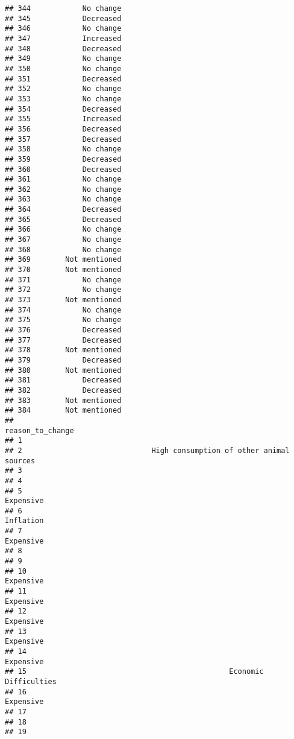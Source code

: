 \documentclass[
]{article}
\begin{document}
\begin{verbatim}
## 344            No change
## 345            Decreased
## 346            No change
## 347            Increased
## 348            Decreased
## 349            No change
## 350            No change
## 351            Decreased
## 352            No change
## 353            No change
## 354            Decreased
## 355            Increased
## 356            Decreased
## 357            Decreased
## 358            No change
## 359            Decreased
## 360            Decreased
## 361            No change
## 362            No change
## 363            No change
## 364            Decreased
## 365            Decreased
## 366            No change
## 367            No change
## 368            No change
## 369        Not mentioned
## 370        Not mentioned
## 371            No change
## 372            No change
## 373        Not mentioned
## 374            No change
## 375            No change
## 376            Decreased
## 377            Decreased
## 378        Not mentioned
## 379            Decreased
## 380        Not mentioned
## 381            Decreased
## 382            Decreased
## 383        Not mentioned
## 384        Not mentioned
##                                                        reason_to_change
## 1                                                                      
## 2                              High consumption of other animal sources
## 3                                                                      
## 4                                                                      
## 5                                                            Expensive 
## 6                                                            Inflation 
## 7                                                            Expensive 
## 8                                                                      
## 9                                                                      
## 10                                                           Expensive 
## 11                                                           Expensive 
## 12                                                           Expensive 
## 13                                                           Expensive 
## 14                                                           Expensive 
## 15                                               Economic Difficulties 
## 16                                                           Expensive 
## 17                                                                     
## 18                                                                     
## 19                                                                     

\end{verbatim}
\end{document}
